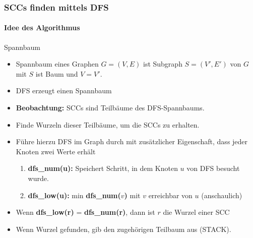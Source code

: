 \begin{frame}
		\frametitle{SCCs finden mittels DFS}
		\framesubtitle{Idee des Algorithmus}
		\begin{KITinfoblock}{Spannbaum}
			\begin{itemize}
				\item Spannbaum eines Graphen $G=(V,E)$ ist Subgraph $S=(V',E')$ von $G$ mit $S$ ist Baum und $V = V'$.
			\end{itemize}
		\end{KITinfoblock}
		\begin{itemize}
			
			\item DFS erzeugt einen Spannbaum
			\item \textbf{Beobachtung:} SCCs sind Teilbäume des DFS-Spannbaums.
			\item Finde Wurzeln dieser Teilbäume, um die SCCs zu erhalten.
			\pause
			\item Führe hierzu DFS im Graph durch mit zusätzlicher Eigenschaft, dass jeder Knoten zwei Werte erhält
		\begin{enumerate}
			\item \textbf{dfs\_num(u):} Speichert Schritt, in dem Knoten $u$ von DFS besucht wurde.
			\item \textbf{dfs\_low(u):} min \textbf{dfs\_num($v$)} mit $v$ erreichbar von $u$ (anschaulich)
		\end{enumerate}
		
		\pause
		\item Wenn \textbf{dfs\_low(r)} =  \textbf{dfs\_num(r)}, dann ist $r$ die Wurzel einer SCC
		\item Wenn Wurzel gefunden, gib den zugehörigen Teilbaum aus (STACK).
		\end{itemize}
\end{frame}
	

